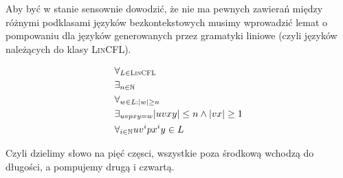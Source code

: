 Aby być w stanie sensownie dowodzić, że nie ma pewnych zawierań między różnymi podklasami języków bezkontekstowych musimy wprowadzić lemat o pompowaniu dla języków generowanych przez gramatyki liniowe (czyli języków należących do klasy \textsc{LinCFL}).

\begin{theorem}
	\large
	\[
		\begin{split}
			 & \forall_{L \in \textsc{LinCFL}}                     \\
			 & \exists_{n \in \natural}                            \\
			 & \forall_{w \in L : |w| \geq n}                      \\
			 & \exists_{uvpxy = w} |uvxy| \leq n \land |vx| \geq 1 \\
			 & \forall_{i \in \natural} uv^ipx^iy \in L
		\end{split}
	\]

\end{theorem}

Czyli dzielimy słowo na pięć częsci, wszystkie poza środkową wchodzą do długości, a pompujemy drugą i czwartą.

